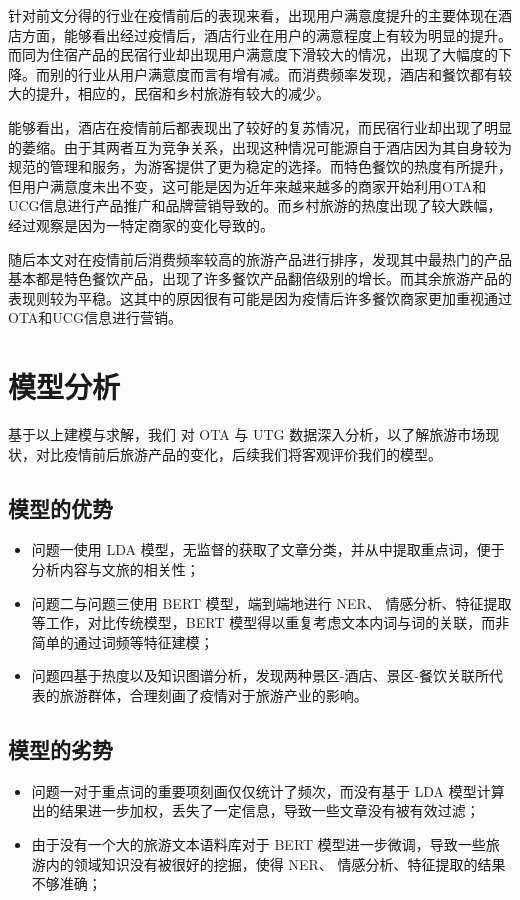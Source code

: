 \documentclass[bwprint]{gmcmthesis}
\begin{document}
针对前文分得的行业在疫情前后的表现来看，出现用户满意度提升的主要体现在酒店方面，能够看出经过疫情后，酒店行业在用户的满意程度上有较为明显的提升。而同为住宿产品的民宿行业却出现用户满意度下滑较大的情况，出现了大幅度的下降。而别的行业从用户满意度而言有增有减。而消费频率发现，酒店和餐饮都有较大的提升，相应的，民宿和乡村旅游有较大的减少。

能够看出，酒店在疫情前后都表现出了较好的复苏情况，而民宿行业却出现了明显的萎缩。由于其两者互为竞争关系，出现这种情况可能源自于酒店因为其自身较为规范的管理和服务，为游客提供了更为稳定的选择。而特色餐饮的热度有所提升，但用户满意度未出不变，这可能是因为近年来越来越多的商家开始利用OTA和UCG信息进行产品推广和品牌营销导致的。而乡村旅游的热度出现了较大跌幅，经过观察是因为一特定商家的变化导致的。

随后本文对在疫情前后消费频率较高的旅游产品进行排序，发现其中最热门的产品基本都是特色餐饮产品，出现了许多餐饮产品翻倍级别的增长。而其余旅游产品的表现则较为平稳。这其中的原因很有可能是因为疫情后许多餐饮商家更加重视通过OTA和UCG信息进行营销。

\section{模型分析}

基于以上建模与求解，我们 对 OTA 与 UTG 数据深入分析，以了解旅游市场现状，对比疫情前后旅游产品的变化，后续我们将客观评价我们的模型。
\subsection{模型的优势}

\begin{itemize}
  \item 问题一使用 LDA 模型，无监督的获取了文章分类，并从中提取重点词，便于分析内容与文旅的相关性；
  \item 问题二与问题三使用 BERT 模型，端到端地进行 NER、 情感分析、特征提取等工作，对比传统模型，BERT 模型得以重复考虑文本内词与词的关联，而非简单的通过词频等特征建模；
  \item 问题四基于热度以及知识图谱分析，发现两种景区-酒店、景区-餐饮关联所代表的旅游群体，合理刻画了疫情对于旅游产业的影响。
\end{itemize}

\subsection{模型的劣势}

\begin{itemize}
  \item 问题一对于重点词的重要项刻画仅仅统计了频次，而没有基于 LDA 模型计算出的结果进一步加权，丢失了一定信息，导致一些文章没有被有效过滤；
  \item 由于没有一个大的旅游文本语料库对于 BERT 模型进一步微调，导致一些旅游内的领域知识没有被很好的挖掘，使得 NER、 情感分析、特征提取的结果不够准确；
\end{itemize}
\end{document}
